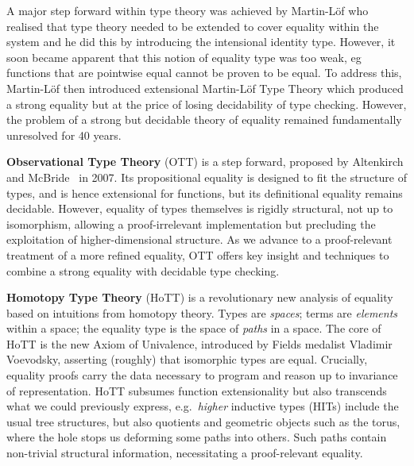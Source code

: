 \documentclass[a4paper,11pt]{article}
\begin{document}
A major step forward within type theory was achieved by Martin-L\"of
who realised that type theory needed to be extended to cover equality
within the system and he did this by introducing the intensional identity type.
However, it soon became apparent that this notion of equality type was
too weak, eg functions that are pointwise equal cannot be proven to
be equal. To address this, Martin-L\"of then introduced extensional
Martin-L\"of Type Theory which produced a strong equality but at the price of
losing decidability of type checking. However, the problem of a strong but
decidable theory of equality remained fundamentally unresolved for 40
years. 

{\bf Observational Type Theory} (OTT) is a step forward, proposed by
Altenkirch and McBride~\cite{alti:ott-conf} in 2007. Its propositional equality is designed
to fit the structure of types, and is hence extensional for functions,
but its definitional equality remains decidable. However, equality of
types themselves is rigidly structural, not up to isomorphism,
allowing a proof-irrelevant implementation but precluding the
exploitation of higher-dimensional structure. As we advance to a
proof-relevant treatment of a more refined equality, OTT offers key
insight and techniques to combine a strong equality with decidable
type checking.




{\bf Homotopy Type Theory} (HoTT) is a revolutionary new analysis of
equality based on intuitions from homotopy theory. Types are \emph{spaces};
terms are \emph{elements} within a space; the equality type is the space of
\emph{paths} in a space. The core of HoTT is the new Axiom of Univalence,
introduced by Fields medalist Vladimir Voevodsky, asserting (roughly)
that isomorphic types are equal. Crucially, equality proofs carry
the data necessary to program and reason up to invariance of
representation. HoTT subsumes function extensionality but also
transcends what we could previously express, e.g.\ \emph{higher}
inductive types (HITs) include the usual tree structures, but
also quotients and geometric objects such as the torus, where the hole
stops us deforming some paths into others. Such paths contain
non-trivial structural information, necessitating a proof-relevant equality.
\end{document}
